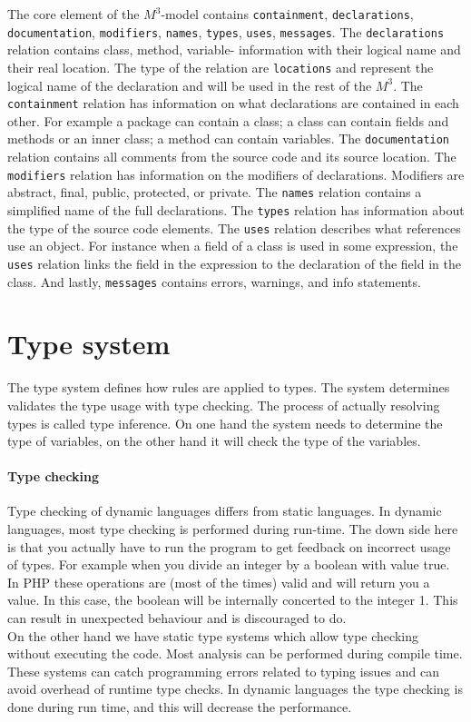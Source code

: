 \documentclass[../main.tex]{subfiles}
\begin{document}
    The core element of the $M^3$-model contains \texttt{containment}, \texttt{declarations}, \texttt{documentation}, \texttt{modifiers}, \texttt{names}, \texttt{types}, \texttt{uses}, \texttt{messages}.
    The \texttt{declarations} relation contains class, method, variable- information with their logical name and their real location. The type of the relation are \texttt{locations} and represent the logical name of the declaration and will be used in the rest of the $M^3$.
    The \texttt{containment} relation has information on what declarations are contained in each other. For example a package can contain a class; a class can contain fields and methods or an inner class; a method can contain variables.    
    The \texttt{documentation} relation contains all comments from the source code and its source location.
    The \texttt{modifiers} relation has information on the modifiers of declarations. Modifiers are abstract, final, public, protected, or private.
    The \texttt{names} relation contains a simplified name of the full declarations.
    The \texttt{types} relation has information about the type of the source code elements.
    The \texttt{uses} relation describes what references use an object. For instance when a field of a class is used in some expression, the \texttt{uses} relation links the field in the expression to the declaration of the field in the class.
    And lastly, \texttt{messages} contains errors, warnings, and info statements.
    
    \section{Type system}\label{sec:background_type-system}
    The type system defines how rules are applied to types.
    The system determines validates the type usage with type checking.
    The process of actually resolving types is called type inference.
    On one hand the system needs to determine the type of variables, on the other hand it will check the type of the variables.
    \paragraph{Type checking}
    Type checking of dynamic languages differs from static languages.
    In dynamic languages, most type checking is performed during run-time.
    The down side here is that you actually have to run the program to get feedback on incorrect usage of types. 
    For example when you divide an integer by a boolean with value true.
    In PHP these operations are (most of the times) valid and will return you a value.
    In this case, the boolean will be internally concerted to the integer 1.
    This can result in unexpected behaviour and is discouraged to do.
    \\
    On the other hand we have static type systems which allow type checking without executing the code.
    Most analysis can be performed during compile time.
    These systems can catch programming errors related to typing issues and can avoid overhead of runtime type checks.
    In dynamic languages the type checking is done during run time, and this will decrease the performance.
    
\end{document}
